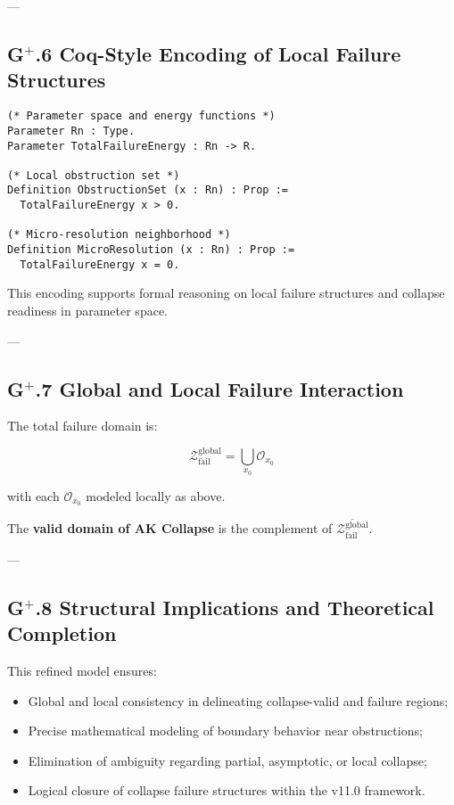 \documentclass[11pt]{article}
\begin{document}
---

\subsection*{G$^{+}$.6 Coq-Style Encoding of Local Failure Structures}

\begin{lstlisting}[language=Coq]
(* Parameter space and energy functions *)
Parameter Rn : Type.
Parameter TotalFailureEnergy : Rn -> R.

(* Local obstruction set *)
Definition ObstructionSet (x : Rn) : Prop :=
  TotalFailureEnergy x > 0.

(* Micro-resolution neighborhood *)
Definition MicroResolution (x : Rn) : Prop :=
  TotalFailureEnergy x = 0.
\end{lstlisting}

This encoding supports formal reasoning on local failure structures and collapse readiness in parameter space.

---

\subsection*{G$^{+}$.7 Global and Local Failure Interaction}

The total failure domain is:

\[
\mathcal{Z}_{\mathrm{fail}}^{\mathrm{global}} = \bigcup_{x_0} \mathcal{O}_{x_0}
\]

with each $\mathcal{O}_{x_0}$ modeled locally as above.

The \textbf{valid domain of AK Collapse} is the complement of $\overline{\mathcal{Z}_{\mathrm{fail}}^{\mathrm{global}}}$.

---

\subsection*{G$^{+}$.8 Structural Implications and Theoretical Completion}

This refined model ensures:

\begin{itemize}
    \item Global and local consistency in delineating collapse-valid and failure regions;
    \item Precise mathematical modeling of boundary behavior near obstructions;
    \item Elimination of ambiguity regarding partial, asymptotic, or local collapse;
    \item Logical closure of collapse failure structures within the v11.0 framework.
\end{itemize}
\end{document}
